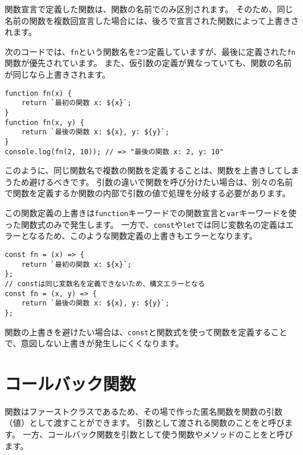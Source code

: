 \begin{tcolorbox}[enhanced jigsaw,breakable,title=同じ名前の関数宣言は上書きされる]\label{function-overwrite}

関数宣言で定義した関数は、関数の名前でのみ区別されます。
そのため、同じ名前の関数を複数回宣言した場合には、後ろで宣言された関数によって上書きされます。

次のコードでは、\texttt{fn}という関数名を2つ定義していますが、最後に定義された\texttt{fn}関数が優先されています。
また、仮引数の定義が異なっていても、関数の名前が同じなら上書きされます。

\begin{lstlisting}
function fn(x) {
    return `最初の関数 x: ${x}`;
}
function fn(x, y) {
    return `最後の関数 x: ${x}, y: ${y}`;
}
console.log(fn(2, 10)); // => "最後の関数 x: 2, y: 10"
\end{lstlisting}

このように、同じ関数名で複数の関数を定義することは、関数を上書きしてしまうため避けるべきです。
引数の違いで関数を呼び分けたい場合は、別々の名前で関数を定義するか関数の内部で引数の値で処理を分岐する必要があります。

この関数定義の上書きは\texttt{function}キーワードでの関数宣言と\texttt{var}キーワードを使った関数式のみで発生します。
一方で、\texttt{const}や\texttt{let}では同じ変数名の定義はエラーとなるため、このような関数定義の上書きもエラーとなります。

\begin{lstlisting}
const fn = (x) => {
    return `最初の関数 x: ${x}`;
};
// constは同じ変数名を定義できないため、構文エラーとなる
const fn = (x, y) => {
    return `最後の関数 x: ${x}, y: ${y}`;
};
\end{lstlisting}

関数の上書きを避けたい場合は、\texttt{const}と関数式を使って関数を定義することで、意図しない上書きが発生しにくくなります。
\end{tcolorbox}

\hypertarget{callback}{%
\section{コールバック関数}\label{callback}}

関数はファーストクラスであるため、その場で作った匿名関数を関数の引数（値）として渡すことができます。
引数として渡される関数のことを\textbf{}と呼びます。
一方、コールバック関数を引数として使う関数やメソッドのことを\textbf{}と呼びます。

